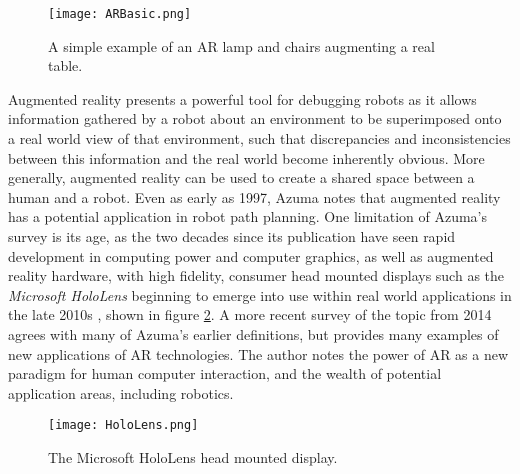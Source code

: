 \begin{figure}[h]
	\begin{center}
	\texttt{[image: ARBasic.png]}
	\decoRule
	\caption[Simple AR visualisation. \cite{Azuma:1997}]{A simple example of an AR lamp and chairs augmenting a real table. \cite{Azuma:1997}}
	\label{fig:ARBasic}
	\end{center}
\end{figure}

Augmented reality presents a powerful tool for debugging robots as it allows information gathered by a robot about an environment to be superimposed onto a real world view of that environment, such that discrepancies and inconsistencies between this information and the real world become inherently obvious. More generally, augmented reality can be used to create a shared space between a human and a robot. Even as early as 1997, Azuma \cite{Azuma:1997} notes that augmented reality has a potential application in robot path planning. One limitation of Azuma's survey is its age, as the two decades since its publication have seen rapid development in computing power and computer graphics, as well as augmented reality hardware, with high fidelity, consumer head mounted displays such as the \textit{Microsoft HoloLens} beginning to emerge into use within real world applications in the late 2010s \cite{HoloLens}, shown in figure \ref{fig:HoloLens}. A more recent survey of the topic from 2014 \cite{Billinghurst:2014} agrees with many of Azuma's earlier definitions, but provides many examples of new applications of AR technologies. The author notes the power of AR as a new paradigm for human computer interaction, and the wealth of potential application areas, including robotics.

\begin{figure}
	\begin{center}
	\texttt{[image: HoloLens.png]}
	\decoRule
	\caption[Microsoft HoloLens. ]{The Microsoft HoloLens head mounted display.}
	\label{fig:HoloLens}
	\end{center}
\end{figure}


